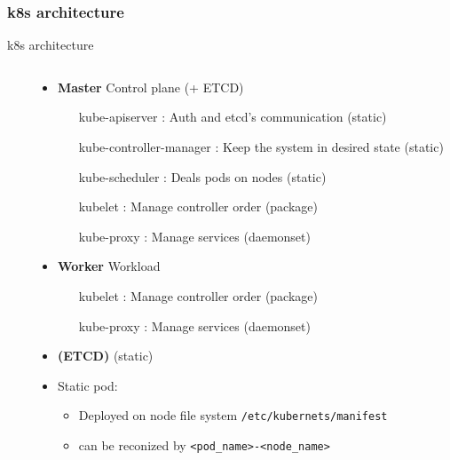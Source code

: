 \subsubsection{k8s architecture}
\begin{frame}{k8s architecture}
\begin{columns}
\begin{column}{0.2\textwidth}
\end{column}
\begin{column}{0.8\textwidth}
  \begin{itemize}
  \item \textbf{Master} Control plane (+ ETCD)
    \begin{itemize}
    \item[kube-apiserver]: Auth and etcd's communication (static)
    \item[kube-controller-manager]: Keep the system in desired state (static)
    \item[kube-scheduler]: Deals pods on nodes (static)
    \item[kubelet]: Manage controller order (package)
    \item[kube-proxy]: Manage services (daemonset)
    \end{itemize}
  \item \textbf{Worker} Workload
    \begin{itemize}
    \item[kubelet]: Manage controller order (package)
    \item[kube-proxy]: Manage services (daemonset)
    \end{itemize}
  \item \textbf{(ETCD)} (static)
  \end{itemize}
  \begin{itemize}
    \item Static pod:
    \begin{itemize}
      \item Deployed on node file system \texttt{/etc/kubernets/manifest}
      \item can be reconized by \texttt{<pod\_name>-<node\_name>}
    \end{itemize}
\end{itemize}
\end{column}
\end{columns}
\end{frame}
